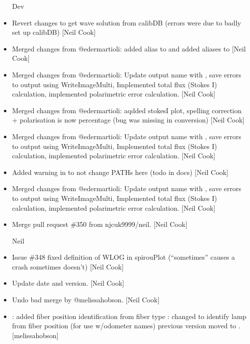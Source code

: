 \documentclass[a4paper,10pt,english]{report}
\begin{document}
\begin{itemize}
Dev

\item {} 
Revert changes to get wave solution from calibDB (errors were due to
badly set up calibDB) {[}Neil Cook{]}

\item {} 
Merged changes from @edermartioli: added alias to 
and added aliases to  {[}Neil Cook{]}

\item {} 
Merged changes from @edermartioli: Update output name with , save
errors to output using WriteImageMulti, Implemented total flux (Stokes
I) calculation, implemented polarimetric error calculation. {[}Neil
Cook{]}

\item {} 
Merged changes from @edermartioli: aqdded stokesI plot, spelling
correction + polarisation is now percentage (bug was missing in
conversion) {[}Neil Cook{]}

\item {} 
Merged changes from @edermartioli: Update output name with , save
errors to output using WriteImageMulti, Implemented total flux (Stokes
I) calculation, implemented polarimetric error calculation. {[}Neil
Cook{]}

\item {} 
Added warning in  to not change PATHs here (todo in docs)
{[}Neil Cook{]}

\item {} 
Merged changes from @edermartioli: Update output name with , save
errors to output using WriteImageMulti, Implemented total flux (Stokes
I) calculation, implemented polarimetric error calculation. {[}Neil
Cook{]}

\item {} 
Merge pull request \#350 from njcuk9999/neil. {[}Neil Cook{]}

Neil

\item {} 
Issue \#348 \sphinxhyphen{} fixed definition of WLOG in spirouPlot (“sometimes”
causes a crash sometimes doesn’t) {[}Neil Cook{]}

\item {} 
Update date and version. {[}Neil Cook{]}

\item {} 
Undo bad merge by @melissa\sphinxhyphen{}hobson. {[}Neil Cook{]}

\item {} 
: added fiber position identification from fiber
type : \sphinxhyphen{} changed to identify lamp from
fiber position (for use w/odometer names) \sphinxhyphen{} previous version moved to
. {[}melissa\sphinxhyphen{}hobson{]}

\end{itemize}
\end{document}
